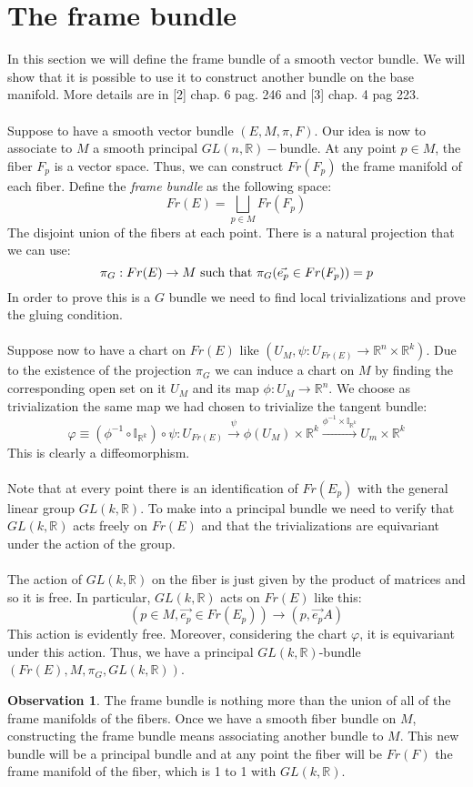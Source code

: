 \documentclass[12pt,a4paper]{report}
\theoremstyle{definition}
\theoremstyle{Theorem}
\theoremstyle{definition}
\theoremstyle{definition}
\newtheorem{Obs}[Def]{Observation}
\begin{document}
	\section{The frame bundle}
	In this section we will define the frame bundle of a smooth vector bundle. We will show that it is possible to use it to construct another bundle on the base manifold. More details are in [2] chap. 6 pag. 246 and [3] chap. 4 pag 223.\\
	\\
	Suppose to have a smooth vector bundle $(E,M,\pi,F)$. Our idea is now to associate to $M$ a smooth principal $GL(n,\mathbb{R})-$bundle. At any point $p\in M$, the fiber $F_p$ is a vector space. Thus, we can construct $Fr(F_p)$ the frame manifold of each fiber. Define the \textit{frame bundle} as the following space:
	$$Fr(E)=\bigsqcup_{p\in M}Fr(F_p)$$
	The disjoint union of the fibers at each point. There is a natural projection that we can use:
	$$\pi_G:Fr(E)\rightarrow M\hbox{ such that } \pi_G(\vec{e_p}\in Fr(F_p))=p$$
	In order to prove this is a $G$ bundle we need to find local trivializations and prove the gluing condition.\\
	\\
	Suppose now to have a chart on $Fr(E)$ like $(U_{M},\psi:U_{Fr(E)}\rightarrow \mathbb{R}^n\times\mathbb{R}^k)$. Due to the existence of the projection $\pi_G$ we can induce a chart on $M$ by finding the corresponding open set on it $U_M$ and its map $\phi:U_M\rightarrow \mathbb{R}^n$. We choose as trivialization the same map we had chosen to trivialize the tangent bundle:
	$$\varphi\equiv(\phi^{-1}\circ \mathbb{I}_{\mathbb{R}^k})\circ \psi: U_{Fr(E)}\xrightarrow{\psi}\phi(U_M)\times\mathbb{R}^k\xrightarrow{\phi^{-1}\times\mathbb{I}_{\mathbb{R}^k}}U_m\times\mathbb{R}^k$$
	This is clearly a diffeomorphism.\\
	\\
	Note that at every point there is an identification of $Fr(E_p)$ with the general linear group $GL(k,\mathbb{R})$. To make into a principal bundle we need to verify that $GL(k,\mathbb{R})$ acts freely on $Fr(E)$ and that the trivializations are equivariant under the action of the group.\\
	\\
	The action of $GL(k,\mathbb{R})$ on the fiber is just given by the product of matrices and so it is free. In particular, $GL(k,\mathbb{R})$ acts on $Fr(E)$ like this:
	$$(p\in M,\vec{e_p}\in Fr(E_p))\longrightarrow(p,\vec{e_p}A)$$
	This action is evidently free. Moreover, considering the chart $\varphi$, it is equivariant under this action. Thus, we have a principal $GL(k,\mathbb{R})$-bundle $(Fr(E),M,\pi_G,GL(k,\mathbb{R}))$.
	\begin{Obs}
		The frame bundle is nothing more than the union of all of the frame manifolds of the fibers. Once we have a smooth fiber bundle on $M$, constructing the frame bundle means associating another bundle to $M$. This new bundle will be a principal bundle and at any point the fiber will be $Fr(F)$ the frame manifold of the fiber, which is 1 to 1 with $GL(k,\mathbb{R})$.
	\end{Obs}
\end{document}
